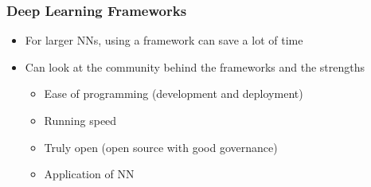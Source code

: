 \documentclass[12pt, letterpaper]{article}
\begin{document}
    \subsubsection{Deep Learning Frameworks}
    \begin{itemize}
        \item For larger NNs, using a framework can save a lot of time 
        \item Can look at the community behind the frameworks and the strengths
        \begin{itemize}
            \item Ease of programming (development and deployment)
            \item Running speed
            \item Truly open (open source with good governance)
            \item Application of NN
        \end{itemize}
    \end{itemize}
\end{document}
